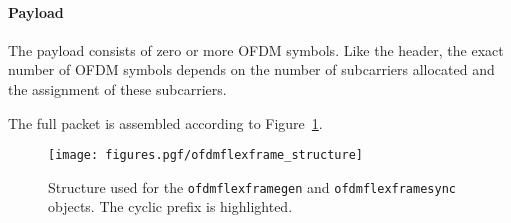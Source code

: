 \paragraph{Payload}
    The payload consists of zero or more OFDM symbols. Like the header,
    the exact number of OFDM symbols depends on the number of
    subcarriers allocated and the assignment of these subcarriers.

The full packet is assembled according to
Figure~\ref{fig:module:framing:ofdmflexframe_structure}.
% 
%
\begin{figure}
\centering
  \texttt{[image: figures.pgf/ofdmflexframe\_structure]}
\caption{
    Structure used for the {\tt ofdmflexframegen} and
    {\tt ofdmflexframesync} objects.
    The cyclic prefix is highlighted.}
\label{fig:module:framing:ofdmflexframe_structure}
\end{figure}


